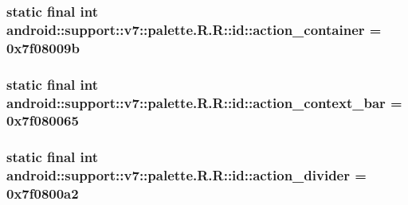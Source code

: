 \hypertarget{classandroid_1_1support_1_1v7_1_1palette_1_1_r_1_1id_06bece9781f98724f00c0eef4bb8c6d4}{
\subsubsection[{action\_\-container}]{\setlength{\rightskip}{0pt plus 5cm}static final int android::support::v7::palette.R.R::id::action\_\-container = 0x7f08009b}}
\label{classandroid_1_1support_1_1v7_1_1palette_1_1_r_1_1id_06bece9781f98724f00c0eef4bb8c6d4}


\hypertarget{classandroid_1_1support_1_1v7_1_1palette_1_1_r_1_1id_e5015ad39269f204a55a4d2ab7f18846}{
\subsubsection[{action\_\-context\_\-bar}]{\setlength{\rightskip}{0pt plus 5cm}static final int android::support::v7::palette.R.R::id::action\_\-context\_\-bar = 0x7f080065}}
\label{classandroid_1_1support_1_1v7_1_1palette_1_1_r_1_1id_e5015ad39269f204a55a4d2ab7f18846}


\hypertarget{classandroid_1_1support_1_1v7_1_1palette_1_1_r_1_1id_6a2a25b50a3b003875ad82d27cf062fb}{
\subsubsection[{action\_\-divider}]{\setlength{\rightskip}{0pt plus 5cm}static final int android::support::v7::palette.R.R::id::action\_\-divider = 0x7f0800a2}}
\label{classandroid_1_1support_1_1v7_1_1palette_1_1_r_1_1id_6a2a25b50a3b003875ad82d27cf062fb}


